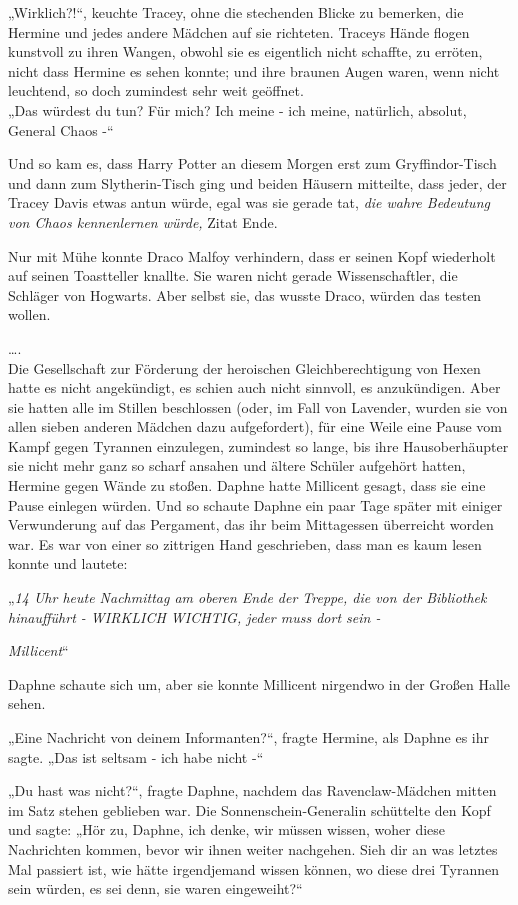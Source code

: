 {„Wirklich?!“, keuchte Tracey, ohne die stechenden Blicke zu bemerken, die Hermine und jedes andere Mädchen auf sie richteten. Traceys Hände flogen kunstvoll zu ihren Wangen, obwohl sie es eigentlich nicht schaffte, zu erröten, nicht dass Hermine es sehen konnte; und ihre braunen Augen waren, wenn nicht leuchtend, so doch zumindest sehr weit geöffnet.\\ „Das würdest du tun? Für mich? Ich meine - ich meine, natürlich, absolut, General Chaos -“

Und so kam es, dass Harry Potter an diesem Morgen erst zum Gryffindor-Tisch und dann zum Slytherin-Tisch ging und beiden Häusern mitteilte, dass jeder, der Tracey Davis etwas antun würde, egal was sie gerade tat, \emph{die wahre Bedeutung von Chaos kennenlernen würde,} Zitat Ende.

Nur mit Mühe konnte Draco Malfoy verhindern, dass er seinen Kopf wiederholt auf seinen Toastteller knallte. Sie waren nicht gerade Wissenschaftler, die Schläger von Hogwarts. Aber selbst sie, das wusste Draco, würden das testen wollen.

….\\ Die Gesellschaft zur Förderung der heroischen Gleichberechtigung von Hexen hatte es nicht angekündigt, es schien auch nicht sinnvoll, es anzukündigen. Aber sie hatten alle im Stillen beschlossen (oder, im Fall von Lavender, wurden sie von allen sieben anderen Mädchen dazu aufgefordert), für eine Weile eine Pause vom Kampf gegen Tyrannen einzulegen, zumindest so lange, bis ihre Hausoberhäupter sie nicht mehr ganz so scharf ansahen und ältere Schüler aufgehört hatten, Hermine gegen Wände zu stoßen. Daphne hatte Millicent gesagt, dass sie eine Pause einlegen würden. Und so schaute Daphne ein paar Tage später mit einiger Verwunderung auf das Pergament, das ihr beim Mittagessen überreicht worden war. Es war von einer so zittrigen Hand geschrieben, dass man es kaum lesen konnte und lautete:

„\emph{14 Uhr heute Nachmittag am oberen Ende der Treppe, die von der Bibliothek hinaufführt - WIRKLICH WICHTIG, jeder muss dort sein -}

\hfill\break

\emph{Millicent}“

Daphne schaute sich um, aber sie konnte Millicent nirgendwo in der Großen Halle sehen.

„Eine Nachricht von deinem Informanten?“, fragte Hermine, als Daphne es ihr sagte. „Das ist seltsam - ich habe nicht -“

„Du hast was nicht?“, fragte Daphne, nachdem das Ravenclaw-Mädchen mitten im Satz stehen geblieben war. Die Sonnenschein-Generalin schüttelte den Kopf und sagte: „Hör zu, Daphne, ich denke, wir müssen wissen, woher diese Nachrichten kommen, bevor wir ihnen weiter nachgehen. Sieh dir an was letztes Mal passiert ist, wie hätte irgendjemand wissen können, wo diese drei Tyrannen sein würden, es sei denn, sie waren eingeweiht?“

}

